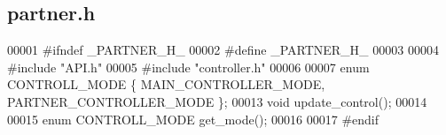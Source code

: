 \subsection{partner.\+h}
\label{a00053_source}

\begin{DoxyCode}
00001 \textcolor{preprocessor}{#ifndef \_PARTNER\_H\_}
00002 \textcolor{preprocessor}{#define \_PARTNER\_H\_}
00003 
00004 \textcolor{preprocessor}{#include "API.h"}
00005 \textcolor{preprocessor}{#include "controller.h"}
00006 
00007 \textcolor{keyword}{enum} CONTROLL_MODE \{ MAIN_CONTROLLER_MODE, PARTNER_CONTROLLER_MODE \};
00013 \textcolor{keywordtype}{void} update_control();
00014 
00015 \textcolor{keyword}{enum} CONTROLL_MODE get_mode();
00016 
00017 \textcolor{preprocessor}{#endif}
\end{DoxyCode}
